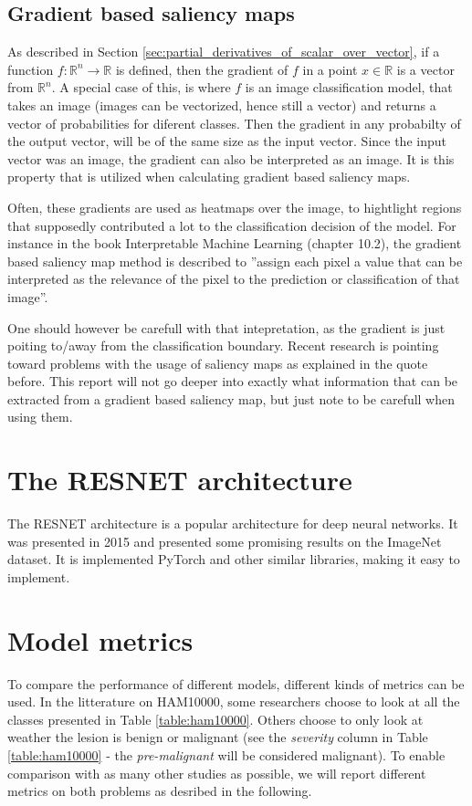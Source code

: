 \subsection{Gradient based saliency maps} \label{sec:gradiant_saliency_maps}
As described in Section \ref{sec:partial_derivatives_of_scalar_over_vector},
if a function $f: \mathbb{R}^n \rightarrow \mathbb{R}$ is defined,
then the gradient of $f$ in a point $x\in\mathbb{R}$ is a vector from $\mathbb{R}^n$.
A special case of this, is where $f$ is an image classification model, that takes
an image (images can be vectorized, hence still a vector) and returns a vector of probabilities for
diferent classes.
Then the gradient in any probabilty of the output vector, will be of the same size as the input vector.
Since the input vector was an image, the gradient can also be interpreted as an image.
It is this property that is utilized when calculating gradient based saliency maps.

Often, these gradients are used as heatmaps over the image, to hightlight regions that 
supposedly contributed a lot to the classification decision of the model. 
For instance in the book Interpretable Machine Learning (chapter 10.2)\cite{interpretable-machine-learning}, the gradient based 
saliency map method is described to
''assign each pixel a value that can be interpreted as the relevance of the pixel to the prediction or classification of that image''.

One should however be carefull with that intepretation, as the gradient is just poiting to/away from the classification boundary.
Recent research is pointing toward problems with the usage of saliency maps as explained in the quote before\cite{false-hope}.
This report will not go deeper into exactly what information that can be extracted from a gradient based saliency map,
but just note to be carefull when using them.

\section{The RESNET architecture}
The RESNET architecture is a popular architecture for deep neural networks.
It was presented in 2015 and presented some promising results on the ImageNet dataset\cite{RESNET-paper}.
It is implemented PyTorch and other similar libraries, making it easy to implement.

\section{Model metrics} \label{sec:model_metrics}
To compare the performance of different models, different kinds of metrics can be used.
In the litterature on HAM10000, some researchers choose to look at all the classes presented 
in Table \ref{table:ham10000}.
Others choose to only look at weather the lesion is benign or malignant 
(see the \textit{severity} column in Table \ref{table:ham10000} - the \textit{pre-malignant} will be considered malignant).
To enable comparison with as many other studies as possible, we will report different metrics
on both problems as desribed in the following.
